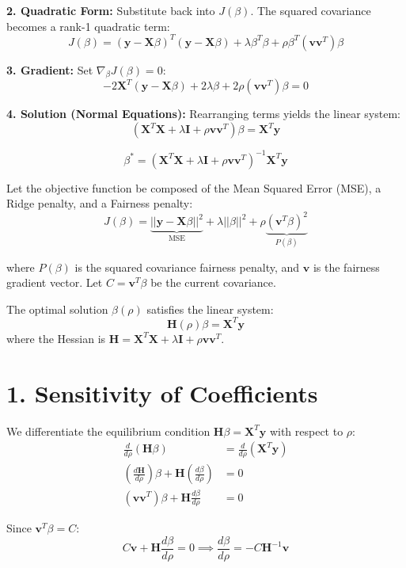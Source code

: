 \documentclass[11pt]{article}
\theoremstyle{plain}
\theoremstyle{definition}
\newcommand{\1}{\mathbf{1}}
\begin{document}
\textbf{2. Quadratic Form:}
Substitute back into $J(\beta)$. The squared covariance becomes a rank-1 quadratic term:
$$ J(\beta) = (\mathbf{y} - \mathbf{X}\beta)^T (\mathbf{y} - \mathbf{X}\beta) + \lambda \beta^T \beta + \rho \beta^T (\mathbf{v}\mathbf{v}^T) \beta $$

\textbf{3. Gradient:}
Set $\nabla_\beta J(\beta) = 0$:
$$ -2\mathbf{X}^T (\mathbf{y} - \mathbf{X}\beta) + 2\lambda \beta + 2\rho (\mathbf{v}\mathbf{v}^T) \beta = 0 $$

\textbf{4. Solution (Normal Equations):}
Rearranging terms yields the linear system:
$$ (\mathbf{X}^T \mathbf{X} + \lambda \mathbf{I} + \rho \mathbf{v}\mathbf{v}^T) \beta = \mathbf{X}^T \mathbf{y} $$

$$ \beta^* = (\mathbf{X}^T \mathbf{X} + \lambda \mathbf{I} + \rho \mathbf{v}\mathbf{v}^T)^{-1} \mathbf{X}^T \mathbf{y} $$


Let the objective function be composed of the Mean Squared Error (MSE), a Ridge penalty, and a Fairness penalty:
$$ J(\beta) = \underbrace{||\mathbf{y} - \mathbf{X}\beta||^2}_{\text{MSE}} + \lambda ||\beta||^2 + \rho \underbrace{(\mathbf{v}^T \beta)^2}_{P(\beta)} $$

where $P(\beta)$ is the squared covariance fairness penalty, and $\mathbf{v}$ is the fairness gradient vector. Let $C = \mathbf{v}^T \beta$ be the current covariance.

The optimal solution $\beta(\rho)$ satisfies the linear system:
$$ \mathbf{H}(\rho) \beta = \mathbf{X}^T \mathbf{y} $$
where the Hessian is $\mathbf{H} = \mathbf{X}^T\mathbf{X} + \lambda\mathbf{I} + \rho\mathbf{v}\mathbf{v}^T$.

\section*{1. Sensitivity of Coefficients}

We differentiate the equilibrium condition $\mathbf{H}\beta = \mathbf{X}^T\mathbf{y}$ with respect to $\rho$:
\begin{align*}
    \frac{d}{d\rho} (\mathbf{H}\beta) &= \frac{d}{d\rho} (\mathbf{X}^T\mathbf{y}) \\
    \left( \frac{d\mathbf{H}}{d\rho} \right) \beta + \mathbf{H} \left( \frac{d\beta}{d\rho} \right) &= 0 \\
    (\mathbf{v}\mathbf{v}^T) \beta + \mathbf{H} \frac{d\beta}{d\rho} &= 0
\end{align*}

Since $\mathbf{v}^T\beta = C$:
$$ C \mathbf{v} + \mathbf{H} \frac{d\beta}{d\rho} = 0 \implies \boxed{ \frac{d\beta}{d\rho} = -C \mathbf{H}^{-1} \mathbf{v} } $$
\end{document}
